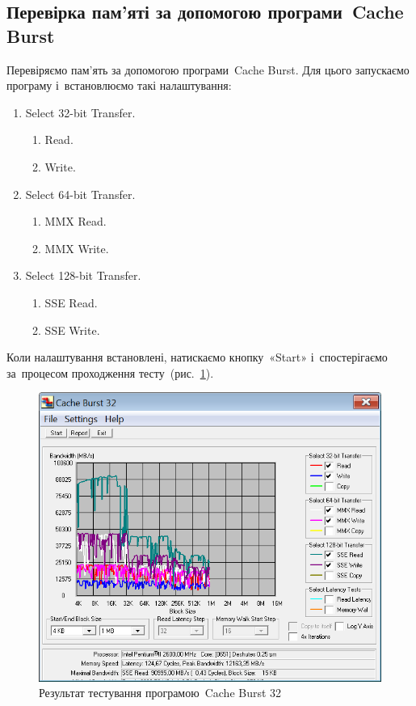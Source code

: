 \documentclass[
	a4paper,
	oneside,
	BCOR = 10mm,
	DIV = 12,
	12pt,
	headings = normal,
]{scrartcl}
\begin{document}
		\subsection{Перевірка пам'яті за допомогою програми~\textenglish{Cache Burst}}
			Перевіряємо пам'ять за допомогою програми~\textenglish{Cache Burst}. Для цього запускаємо програму і~встановлюємо такі налаштування: 
			\begin{enumerate}
				\item \textenglish{Select 32-bit Transfer}.
					\begin{enumerate}[topsep = 0em]
						\item \textenglish{Read}.
						\item \textenglish{Write}.
					\end{enumerate}
				\item \textenglish{Select 64-bit Transfer}.
					\begin{enumerate}[topsep = 0em]
						\item \textenglish{MMX Read}.
						\item \textenglish{MMX Write}.
					\end{enumerate}
				\item \textenglish{Select 128-bit Transfer}.
					\begin{enumerate}[topsep = 0em]
						\item \textenglish{SSE Read}.
						\item \textenglish{SSE Write}.
					\end{enumerate}
			\end{enumerate}
			Коли налаштування встановлені, натискаємо кнопку~«\textenglish{Start}» і~спостерігаємо за~процесом проходження тесту~(рис.~\ref{fig:cburst-32-test}). 

			\begin{figure}[!htbp]
				\centering
				\includegraphics[height = 10\baselineskip]{./assets/y03s02-pcdiag-lab-02-p01-01.png}
				\caption{Результат тестування програмою~\textenglish{Cache Burst 32}}
				\label{fig:cburst-32-test}
			\end{figure}
\end{document}
